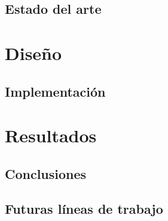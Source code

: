 \newpage

\section{Estado del arte}

\cleardoublepage

\chapter{Diseño}

\section{Implementación}

\cleardoublepage

\chapter{Resultados}

\section{Conclusiones}

\section{Futuras líneas de trabajo}
